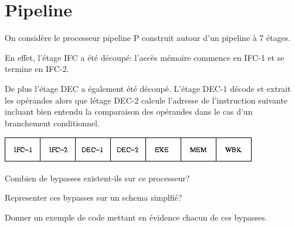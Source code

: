 %
%

\section{Pipeline}

On consid\`ere le processeur pipeline P construit autour d'un pipeline
\`a 7 \'etages.

En effet, l'\'etage IFC a \'et\'e d\'ecoup\'e: l'acc\`es m\'emoire commence
en IFC-1 et se termine en IFC-2.

De plus l'\'etage DEC a \'egalement \'et\'e d\'ecoup\'e. L'\'etage
DEC-1 d\'ecode et extrait les op\'erandes alors que l\'etage DEC-2 calcule
l'adresse de l'instruction suivante incluant bien entendu la comparaison
des op\'erandes dans le cas d'un branchement conditionnel.

\begin{center}
  \includegraphics[scale=0.7]{figures/pipeline.jpg}
\end{center}

Combien de bypasses existent-ils sur ce processeur?

Representer ces bypasses sur un schema simplfi\'e?

Donner un exemple de code mettant en \'evidence chacun de ces bypasses.

